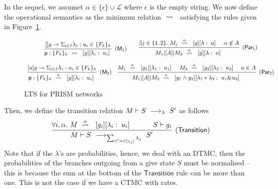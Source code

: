 



In the sequel, we assumet $\alpha\in\{\epsilon\}\cup \mathcal L$ where
$\epsilon$ is the empty string. We now define the operational
semantics as the minimum relation $\ \stackrel{}{\rightsquigarrow}\ {}$ satisfying the rules
given in Figure~\ref{fig:semantics}.
% 
\begin{figure}[t]
  \begin{displaymath}\small
    \begin{array}{ccc}
      \infer[\mathsf{(M_1)}]
      { {\role{p}:\{F_k\}_k} \prismred{}\lab{g}{\lambda_i}{u_i} }
      {\command {}g\lambda u\in\{F_k\}_k}
      \qquad
      \infer[\mathsf{(Par_1)}]
      {M_1\ppp A M_2\prismred{a}\lab g\lambda u }
      {
      \exists j\in\{1,2\}.\ 
      M_j\prismred{\alpha}\lab g\lambda u
      & \alpha\not\in A
        }
      \\\\
      \infer[\mathsf{(M_2)}]
      { {\role{p}:\{F_k\}_k} \prismred{a}\lab{g}{\lambda_i}{u_i} }
      {\command ag\lambda u\in\{F_k\}_k}
      \quad
      \infer[\mathsf{(Par_2)}]
      {M_1\ppp A M_2\prismred{a}\lab{g_1\land g_2}{\lambda_1*\lambda_2}{u_1\& u_2} }
      {
      M_1\prismred{a}\lab{g_1}{\lambda_1}{u_1} 
      & M_2\prismred{a}\lab{g_2}{\lambda_2}{u_2} 
      & a\in A}
    \end{array}
  \end{displaymath}
  \caption{LTS for PRISM networks} 
  \label{fig:semantics}
\end{figure}

Then, we define the transition relation $M\vdash S\ \longrightarrow_{\lambda}\ S'$ as
follows
$$
\infer[\mathsf{(Transition)}]
{
  M\vdash S\red{\sum_{S'= S[u_j]} \lambda_j}S'
}
{
  \forall i,\alpha.\ M\prismred{\alpha}\lab {g_i}{\lambda_i}{u_i}
  \quad&\quad
  S\vdash g_i
}
$$
Note that if the $\lambda$'s are probabilities, hence, we deal with an
DTMC, then the probabilities of the branches outgoing from a give
state $S$ must be normalised -- this is because the sum at the bottom
of the $\mathsf{Transition}$ rule can be more than one. This is not
the case if we have a CTMC with rates.


